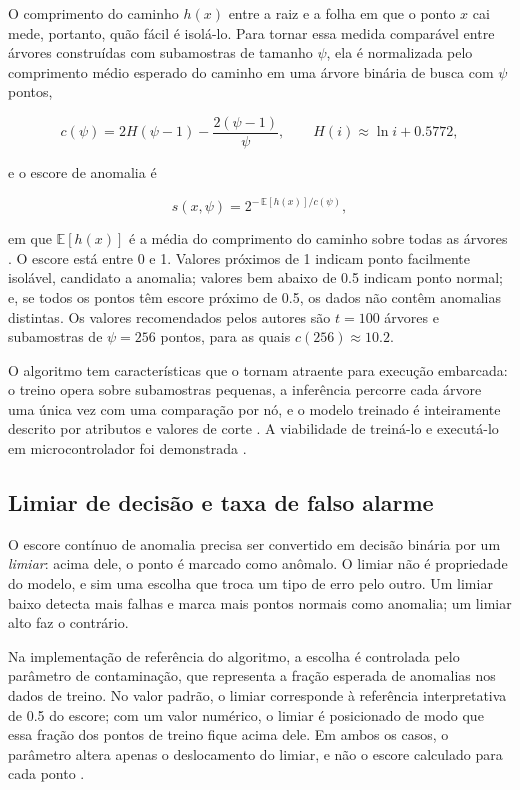 O comprimento do caminho $h(x)$ entre a raiz e a folha em que o ponto $x$ cai mede,
portanto, quão fácil é isolá-lo. Para tornar essa medida comparável entre árvores
construídas com subamostras de tamanho $\psi$, ela é normalizada pelo comprimento médio
esperado do caminho em uma árvore binária de busca com $\psi$ pontos,

\begin{equation}
c(\psi) = 2H(\psi-1) - \frac{2(\psi-1)}{\psi}, \qquad H(i) \approx \ln i + \num{0,5772},
\label{eq:fund-cn}
\end{equation}

\noindent
e o escore de anomalia é

\begin{equation}
s(x, \psi) = 2^{-\,\mathbb{E}[h(x)] / c(\psi)},
\label{eq:fund-score}
\end{equation}

\noindent
em que $\mathbb{E}[h(x)]$ é a média do comprimento do caminho sobre todas as árvores
\cite{liu2008}. O escore está entre 0 e 1. Valores próximos de 1 indicam ponto facilmente
isolável, candidato a anomalia; valores bem abaixo de \num{0,5} indicam ponto normal; e, se
todos os pontos têm escore próximo de \num{0,5}, os dados não contêm anomalias distintas. Os
valores recomendados pelos autores são $t = 100$ árvores e subamostras de $\psi = 256$
pontos, para as quais $c(256) \approx \num{10,2}$.

O algoritmo tem características que o tornam atraente para execução embarcada: o treino
opera sobre subamostras pequenas, a inferência percorre cada árvore uma única vez com uma
comparação por nó, e o modelo treinado é inteiramente descrito por atributos e valores de
corte \cite{liu2008}. A viabilidade de treiná-lo e executá-lo em microcontrolador foi
demonstrada \cite{antonini2023}.

\subsection{Limiar de decisão e taxa de falso alarme}
\label{sec:fund-limiar}

O escore contínuo de anomalia precisa ser convertido em decisão binária por um
\emph{limiar}: acima dele, o ponto é marcado como anômalo. O limiar não é propriedade do
modelo, e sim uma escolha que troca um tipo de erro pelo outro. Um limiar baixo detecta mais
falhas e marca mais pontos normais como anomalia; um limiar alto faz o contrário.

Na implementação de referência do algoritmo, a escolha é controlada pelo parâmetro de
contaminação, que representa a fração esperada de anomalias nos dados de treino. No valor
padrão, o limiar corresponde à referência interpretativa de \num{0,5} do escore; com um valor
numérico, o limiar é posicionado de modo que essa fração dos pontos de treino fique acima
dele. Em ambos os casos, o parâmetro altera apenas o deslocamento do limiar, e não o escore
calculado para cada ponto \cite{scikitlearn2026}.

